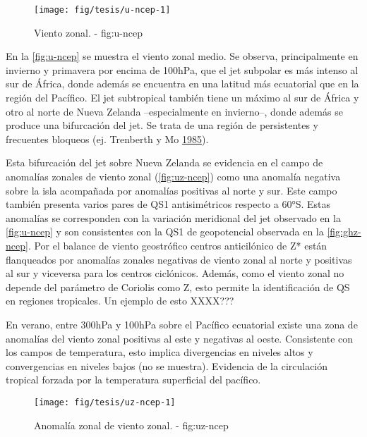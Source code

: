 \documentclass[spanish,a4paper,12p]{book}
\begin{document}
\begin{landscape}\begin{figure}

{\centering \texttt{[image: fig/tesis/u-ncep-1]} 

}

\caption{Viento zonal. - fig:u-ncep}\label{fig:u-ncep}
\end{figure}
\end{landscape}

En la \autoref{fig:u-ncep} se muestra el viento zonal medio. Se observa,
principalmente en invierno y primavera por encima de 100hPa, que el jet
subpolar es más intenso al sur de África, donde además se encuentra en
una latitud más ecuatorial que en la región del Pacífico. El jet
subtropical también tiene un máximo al sur de África y otro al norte de
Nueva Zelanda --especialmente en invierno--, donde además se produce una
bifurcación del jet. Se trata de una región de persistentes y frecuentes
bloqueos (ej. Trenberth y Mo
\protect\hyperlink{ref-Trenberth1985}{1985}).

Esta bifurcación del jet sobre Nueva Zelanda se evidencia en el campo de
anomalías zonales de viento zonal (\autoref{fig:uz-ncep}) como una
anomalía negativa sobre la isla acompañada por anomalías positivas al
norte y sur. Este campo también presenta varios pares de QS1
antisimétricos respecto a 60°S. Estas anomalías se corresponden con la
variación meridional del jet observado en la \autoref{fig:u-ncep} y son
consistentes con la QS1 de geopotencial observada en la
\autoref{fig:ghz-ncep}. Por el balance de viento geostrófico centros
anticilónico de Z* están flanqueados por anomalías zonales negativas de
viento zonal al norte y positivas al sur y viceversa para los centros
ciclónicos. Además, como el viento zonal no depende del parámetro de
Coriolis como Z, esto permite la identificación de QS en regiones
tropicales. Un ejemplo de esto XXXX???

En verano, entre 300hPa y 100hPa sobre el Pacífico ecuatorial existe una
zona de anomalías del viento zonal positivas al este y negativas al
oeste. Consistente con los campos de temperatura, esto implica
divergencias en niveles altos y convergencias en niveles bajos (no se
muestra). Evidencia de la circulación tropical forzada por la
temperatura superficial del pacífico.

\begin{landscape}\begin{figure}

{\centering \texttt{[image: fig/tesis/uz-ncep-1]} 

}

\caption{Anomalía zonal de viento zonal. - fig:uz-ncep}\label{fig:uz-ncep}
\end{figure}
\end{landscape}
\end{document}
